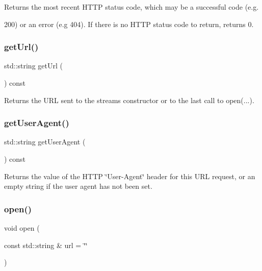 Returns the most recent H\+T\+TP status code, which may be a successful code (e.\+g. 

200) or an error (e.\+g 404). If there is no H\+T\+TP status code to return, returns 0. \mbox{\label{classiurlstream_a0cbda75589e2fb500bbe875b72f66682}} 
\subsubsection{\texorpdfstring{get\+Url()}{getUrl()}}
{\footnotesize\ttfamily std\+::string get\+Url (\begin{DoxyParamCaption}{ }\end{DoxyParamCaption}) const}



Returns the U\+RL sent to the stream\textquotesingle{}s constructor or to the last call to open(...). 

\mbox{\label{classiurlstream_a479f109234aad1c792be804bf6320c62}} 
\subsubsection{\texorpdfstring{get\+User\+Agent()}{getUserAgent()}}
{\footnotesize\ttfamily std\+::string get\+User\+Agent (\begin{DoxyParamCaption}{ }\end{DoxyParamCaption}) const}



Returns the value of the H\+T\+TP \char`\"{}\+User-\/\+Agent\char`\"{} header for this U\+RL request, or an empty string if the user agent has not been set. 

\mbox{\label{classiurlstream_a9759fd1c1bf1427fa02340c2dabd47d6}} 
\subsubsection{\texorpdfstring{open()}{open()}}
{\footnotesize\ttfamily void open (\begin{DoxyParamCaption}\item[{const std\+::string \&}]{url = {\ttfamily \char`\"{}\char`\"{}} }\end{DoxyParamCaption})}



